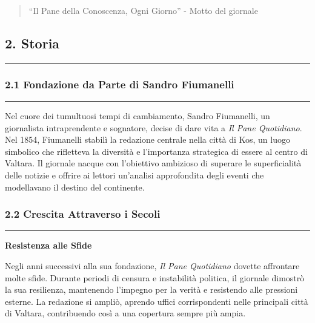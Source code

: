 \begin{quote}
``Il Pane della Conoscenza, Ogni Giorno'' - Motto del giornale
\end{quote}

\subsection{2. Storia}\label{storia}

\begin{center}\rule{0.5\linewidth}{0.5pt}\end{center}

\subsubsection{2.1 Fondazione da Parte di Sandro
Fiumanelli}\label{fondazione-da-parte-di-sandro-fiumanelli}

\begin{center}\rule{0.5\linewidth}{0.5pt}\end{center}

Nel cuore dei tumultuosi tempi di cambiamento, Sandro Fiumanelli, un
giornalista intraprendente e sognatore, decise di dare vita a \emph{Il
Pane Quotidiano}. Nel 1854, Fiumanelli stabilì la redazione centrale
nella città di Kos, un luogo simbolico che rifletteva la diversità e
l'importanza strategica di essere al centro di Valtara. Il giornale
nacque con l'obiettivo ambizioso di superare le superficialità delle
notizie e offrire ai lettori un'analisi approfondita degli eventi che
modellavano il destino del continente.

\subsubsection{\texorpdfstring{2.2 \textbf{Crescita Attraverso i
Secoli}}{2.2 Crescita Attraverso i Secoli}}\label{crescita-attraverso-i-secoli}

\begin{center}\rule{0.5\linewidth}{0.5pt}\end{center}

\textbf{Resistenza alle Sfide}

Negli anni successivi alla sua fondazione, \emph{Il Pane Quotidiano}
dovette affrontare molte sfide. Durante periodi di censura e instabilità
politica, il giornale dimostrò la sua resilienza, mantenendo l'impegno
per la verità e resistendo alle pressioni esterne. La redazione si
ampliò, aprendo uffici corrispondenti nelle principali città di Valtara,
contribuendo così a una copertura sempre più ampia.

